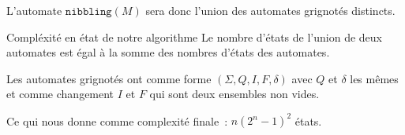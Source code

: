 \begin{frame}{\myframetitle}
  \begin{definition}
    L'automate \(\texttt{nibbling}(M)\) sera donc l'union des automates
    grignotés distincts.
  \end{definition}

  \pause[]

  \begin{block}{Compléxité en état de notre algorithme}
    Le nombre d'états de l'union de deux automates est égal à la somme des
    nombres d'états des automates.

    \pause[]

    \vphantom{}

    Les automates grignotés ont comme forme \((\Sigma, Q, I, F, \delta)\) avec
    \(Q\) et \(\delta\) les mêmes et comme changement \(I\) et \(F\) qui sont
    deux ensembles non vides.

    \pause[]

    \vphantom{}

    Ce qui nous donne comme complexité finale~: \(n(2^n - 1)^2\) états.
  \end{block}
\end{frame}

